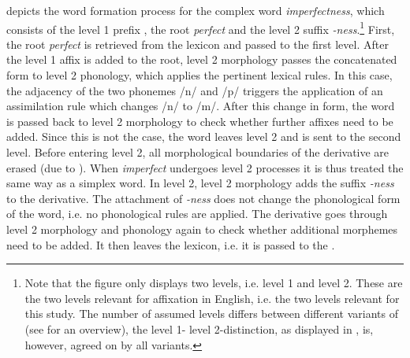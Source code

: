  depicts the word formation process for the complex word \textit{imperfectness}, which consists of the level 1 prefix , the root \textit{perfect} and the level 2 suffix \textit{-ness}.\footnote{Note that the figure only displays two levels, i.e. level 1 and level 2. These are the two levels relevant for affixation in English, i.e. the two levels relevant for this study. The number of assumed levels differs between different variants of  (see \citealt{Giegerich.1999} for an overview), the level 1- level 2-distinction, as displayed in , is, however, agreed on by all variants.}
First, the root \textit{perfect} is retrieved from the lexicon and passed to the first level. After the level 1 affix  is added to the root, level 2 morphology passes the concatenated form to level 2 phonology, which applies the pertinent lexical rules. In this case, the adjacency of the two phonemes /n/ and /p/ triggers the application of an assimilation rule which changes /n/ to /m/. After this change in form, the word is passed back to level 2 morphology to check whether further affixes need to be added. Since this is not the case, the word leaves level 2 and is sent to the second level. 
Before entering level 2, all morphological boundaries of the derivative are erased (due to ). When \textit{imperfect} undergoes level 2 processes it is thus treated the same way as a simplex word.  
In level 2, level 2 morphology adds the suffix \textit{-ness} to the derivative. The attachment of \textit{-ness} does not change the phonological form of the word, i.e. no phonological rules are applied. The derivative goes through level 2 morphology and phonology again to check whether additional morphemes need to be added. It then leaves the lexicon, i.e. it is passed to the .\\

